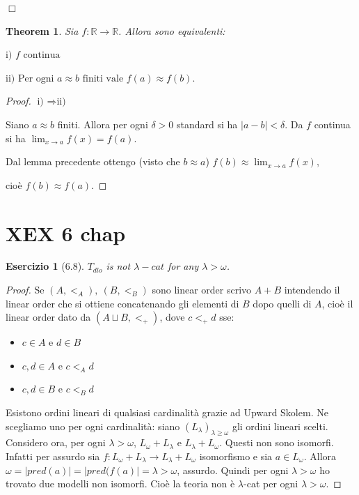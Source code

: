 \documentclass{book}
\newtheorem*{theorem}{Theorem}
\newtheorem*{esercizio}{Esercizio}
\begin{document}
\hfill $\Box$















\begin{theorem}
Sia \( f: \mathbb{R} \to \mathbb{R} \). Allora sono equivalenti: 

\(
\text{i) } f \text{ continua}
\)

\(
\text{ii) Per ogni } a \approx b \text{ finiti vale } f(a) \approx f(b).
\)
\end{theorem}

\begin{proof}
\( \text{i) } \Rightarrow \text{ii)} \)

Siano \( a \approx b \) finiti. Allora per ogni \( \delta > 0 \) standard si ha \( |a-b| < \delta \). Da \( f \) continua si ha
\( \lim_{x \to a} f(x) = f(a). \)

Dal lemma precedente ottengo (visto che \( b \approx a \)) \(
f(b) \approx \lim_{x \to a} f(x), \)

cioè \( f(b) \approx f(a).\)


\end{proof}


\section{XEX 6 chap}


\begin{esercizio}[6.8]
$T_{dlo}$ is not $\lambda-cat$ for any $\lambda >\omega$.    
\end{esercizio}

\begin{proof}
    Se $(A,<_{A}), \ (B,<_{B})$ sono linear order scrivo $A+B$ intendendo il linear order che si ottiene concatenando gli elementi di $B$ dopo quelli di $A$, cioè il linear order dato da $(A \sqcup B, <_{+})$, dove $c <_{+} d$ sse:
    \begin{itemize}
        \item $c \in A$ e $d \in B$
        \item $c,d \in A$ e $c <_{A} d$
        \item $c,d \in B$ e $c <_{B} d$
    \end{itemize}

    Esistono ordini lineari di qualsiasi cardinalità grazie ad Upward Skolem. Ne scegliamo uno per ogni cardinalità: siano $(L_\lambda)_{\lambda \geq \omega}$ gli ordini lineari scelti. Considero ora, per ogni $\lambda > \omega$, $L_{\omega}+ L_{\lambda}$ e $L_{\lambda}+ L_{\omega}$. Questi non sono isomorfi. Infatti per assurdo sia $f:L_{\omega}+ L_{\lambda} \to L_{\lambda}+ L_{\omega}$ isomorfismo e sia $a \in L_{\omega}$. Allora $\omega = |pred(a)| = |pred(f(a)| = \lambda > \omega$, assurdo. Quindi per ogni $\lambda > \omega$ ho trovato due modelli non isomorfi. Cioè la teoria non è $\lambda$-cat per ogni $\lambda > \omega$.
\end{proof}
\end{document}
